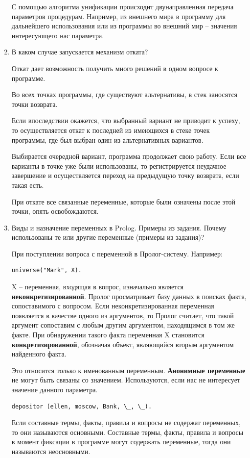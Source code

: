 \documentclass[a4paper,14pt]{extreport} %
\begin{document}
\begin{enumerate}
С помощью алгоритма унификации происходит двунаправленная передача параметров процедурам. Например, из внешнего мира в программу для дальнейшего использования или из программы во внешний мир -- значения интересующего нас параметра. 

\item В каком случае запускается механизм отката?

Откат дает возможность получить много решений в одном вопросе к программе. 

Во всех точках программы, где существуют альтернативы, в стек заносятся точки возврата. 

Если впоследствии окажется, что выбранный вариант не приводит к успеху, то осуществляется откат к последней из имеющихся в стеке точек программы, где был выбран один из альтернативных вариантов. 

Выбирается очередной вариант, программа продолжает свою работу. Если все варианты в точке уже были использованы, то регистрируется неудачное завершение и осуществляется переход на предыдущую точку возврата, если такая есть. 

При откате все связанные переменные, которые были означены после этой точки, опять освобождаются.

\item Виды и назначение переменных в Prolog. Примеры из задания.  Почему использованы те или другие переменные (примеры из задания)?

При поступлении вопроса с переменной в Пролог-систему. Например:
\begin{lstlisting}
universe("Mark", X).
\end{lstlisting}

X -- переменная, входящая в вопрос, изначально является \textbf{неконкретизированной}. Пролог просматривает базу данных в поисках факта, сопоставимого с вопросом. Если неконкретизированная переменная появляется в качестве одного из аргументов, то Пролог считает, что такой аргумент сопоставим с любым другим аргументом, находящимся в том же факте. При обнаружении такого факта переменная X становится \textbf{конкретизированной}, обозначая объект, являющийся вторым аргументом найденного факта.

Это относится только к именованным переменным. \textbf{Анонимные переменные} не могут быть связаны со значением. Используются, если нас не интересует значение данного параметра. 
\begin{lstlisting}
depositor (ellen, moscow, Bank, \_, \_). 
\end{lstlisting}

Если составные термы, факты, правила и вопросы не содержат переменных, то они называются основными. Составные термы, факты, правила и вопросы в момент фиксации в программе могут содержать переменные, тогда они называются неосновными. 

 \end{enumerate}
 
\end{document}
